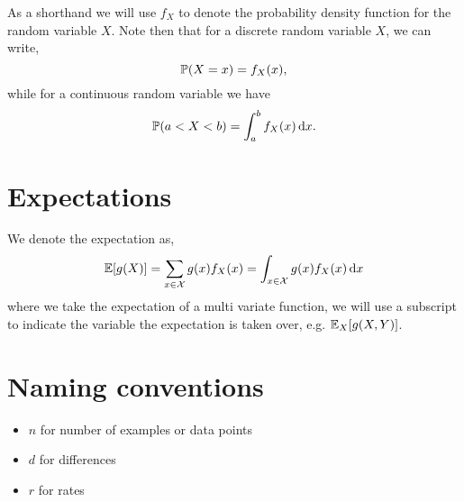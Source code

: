As a shorthand we will use $f_X$ to denote the probability density function for the random variable $X$. Note then that for a discrete random variable $X$, we can write,
\[
\mathbb{P}(X=x) = f_{X}(x),
\]
while for a continuous random variable we have
\[
\mathbb{P}(a<X<b) = \int_a^b f_X(x) \, \mathrm{d} x.
\]

\section*{Expectations}

We denote the expectation as,
\[
\mathbb{E}[g(X)] = \sum_{x\in\mathcal{X}} g(x)f_X(x) = \int_{x\in\mathcal{X}} g(x)f_X(x) \, \mathrm{d} x
\]
where we take the expectation of a multi variate function, we will use a subscript to indicate the variable the expectation is taken over, e.g. $\mathbb{E}_X[g(X,Y)]$.

\section*{Naming conventions}

\begin{itemize}
\item $n$ for number of examples or data points
\item $d$ for differences
\item $r$ for rates
\end{itemize}



